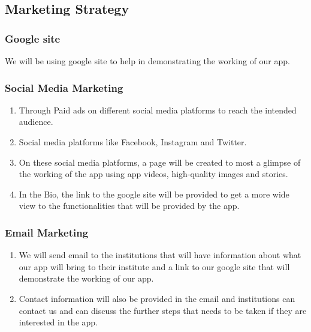 \subsection{Marketing Strategy}
\subsubsection{Google site}
We will be using google site to help in demonstrating the working of our app.

\subsubsection{Social Media Marketing}
\begin{enumerate}
    \item Through Paid ads on different social media platforms to reach the intended audience.
    \item Social media platforms like Facebook, Instagram and Twitter.
    \item On these social media platforms, a page will be created to most a glimpse of the working of the app using app videos, high-quality images and stories.
    \item In the Bio, the link to the google site will be provided to get a more wide view to the functionalities that will be provided by the app.
\end{enumerate}

\subsubsection{Email Marketing}
\begin{enumerate}
    \item We will send email to the institutions that will have information about what our app will bring to their institute and a link to our google site that will demonstrate the working of our app.
    \item Contact information will also be provided in the email and institutions can contact us and can discuss the further steps that needs to be taken if they are interested in the app.
\end{enumerate}